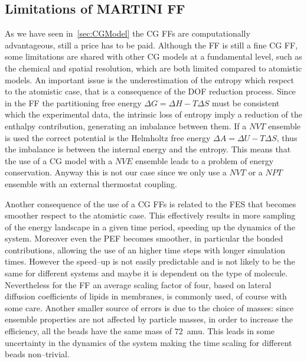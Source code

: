 \subsection{Limitations of MARTINI FF}
As we have seen in~\ref{sec:CGModel} the \ac{CG} \acp{FF} are computationally advantageous, still a price has to 
be paid. Although the \martini \ac{FF} is still a fine \ac{CG} \ac{FF}, some limitations are shared with other 
\ac{CG} models at a fundamental level, such as the chemical and spatial resolution, which are both limited 
compared to atomistic models. An important issue is the underestimation of the entropy which respect to the 
atomistic case, that is a consequence of the \ac{DOF} reduction process. Since in the \martini \ac{FF} the 
partitioning free energy $\Delta G = \Delta H - T\Delta S$ must be consistent which the experimental data, the 
intrinsic loss of entropy imply a reduction of the enthalpy contribution, generating an imbalance between them. 
If a $NVT$ ensemble is used the correct potential is the Helmholtz free energy $\Delta A = \Delta U - T\Delta S$, 
thus the imbalance is between the internal energy and the entropy. This means that the use of a \ac{CG} model 
with a $NVE$ ensemble leads to a problem of energy conservation. Anyway this is not our case since we only use a 
$NVT$ or a $NPT$ ensemble with an external thermostat coupling.

Another consequence of the use of a \ac{CG} \acp{FF} is related to the \ac{FES} that becomes smoother respect to 
the atomistic case. This effectively results in more sampling of the energy landscape in a given time period, 
speeding up the dynamics of the system. Moreover even the \ac{PEF} becomes smoother, in particular the bonded 
contributions, allowing the use of an higher time steps with longer simulation times. However the speed--up is 
not easily predictable and is not likely to be the same for different systems and maybe it is dependent on the 
type of molecule. Nevertheless for the \martini \ac{FF} an average scaling factor of four, based on lateral 
diffusion coefficients of lipids in membranes, is commonly used, of course with some care. Another smaller source 
of errors is due to the choice of masses: since ensemble properties are not affected by particle masses, in order 
to increase the efficiency, all the \martini beads have the same mass of $72$~amu. This leads in some uncertainty 
in the dynamics of the system making the time scaling for different beads non--trivial.

